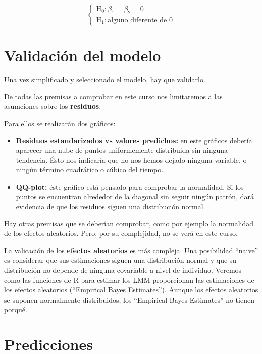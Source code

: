 \documentclass[
]{book}
\begin{document}
\[
\left\{\begin{array}{l}
\text{H}_0: \beta_1 = \beta_2 = 0\\
\text{H}_1: \text{alguno diferente de 0}
\end{array}\right.
\]

\hypertarget{validaciuxf3n-del-modelo}{%
\section{Validación del modelo}\label{validaciuxf3n-del-modelo}}

Una vez simplificado y seleccionado el modelo, hay que validarlo.

De todas las premisas a comprobar en este curso nos limitaremos a las asumciones sobre los \textbf{residuos}.

Para ellos se realizarán dos gráficos:

\begin{itemize}
\item
  \textbf{Residuos estandarizados vs valores predichos:} en este gráficos debería aparecer una nube de puntos
  uniformemente distribuida sin ninguna tendencia. Ésto nos indicaría que no nos hemos dejado ninguna variable, o ningún término cuadrático o cúbico del tiempo.
\item
  \textbf{QQ-plot:} éste gráfico está pensado para comprobar la normalidad. Si los puntos se encuentran alrededor de la diagonal sin seguir ningún patrón, dará evidencia de que los residuos siguen una distribución normal
\end{itemize}

Hay otras premisas que se deberían comprobar, como por ejemplo la normalidad de los efectos aleatorios. Pero, por su complejidad, no se verá en este curso.

La valicación de los \textbf{efectos aleatorios} es más compleja. Una posibilidad ``naive'' es considerar que sus estimaciones siguen una distribución normal y que su distribución no depende de ninguna covariable a nivel de individuo. Veremos como las funciones de R para estimar los LMM proporcionan las estimaciones de los efectos aleatorios (``Empirical Bayes Estimates''). Aunque los efectos aleatorios se suponen normalmente distribuidos, los ``Empirical Bayes Estimates'' no tienen porqué.

\hypertarget{predicciones}{%
\section{Predicciones}\label{predicciones}}
\end{document}
